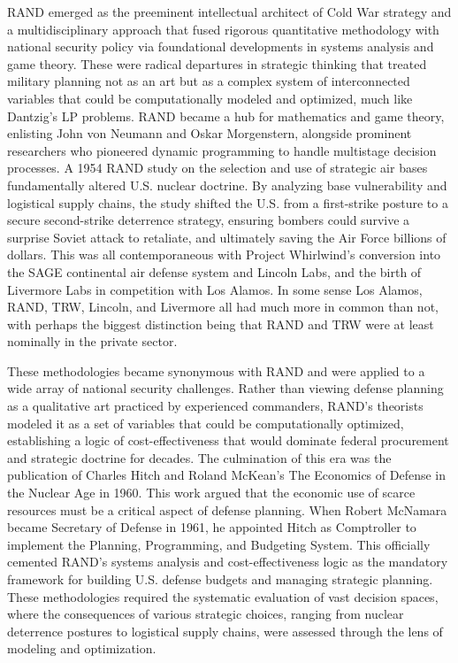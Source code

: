 RAND emerged as the preeminent intellectual architect of Cold War strategy and a multidisciplinary approach that fused rigorous quantitative methodology with national security policy via foundational developments in systems analysis and game theory. These were radical departures in strategic thinking that treated military planning not as an art but as a complex system of interconnected variables that could be computationally modeled and optimized, much like Dantzig’s LP problems. RAND became a hub for mathematics and game theory, enlisting John von Neumann and Oskar Morgenstern, alongside prominent researchers who pioneered dynamic programming to handle multistage decision processes. A 1954 RAND study on the selection and use of strategic air bases fundamentally altered U.S. nuclear doctrine. By analyzing base vulnerability and logistical supply chains, the study shifted the U.S. from a first-strike posture to a secure second-strike deterrence strategy, ensuring bombers could survive a surprise Soviet attack to retaliate, and ultimately saving the Air Force billions of dollars. This was all contemporaneous with Project Whirlwind’s conversion into the SAGE continental air defense system and Lincoln Labs, and the birth of Livermore Labs in competition with Los Alamos. In some sense Los Alamos, RAND, TRW, Lincoln, and Livermore all had much more in common than not, with perhaps the biggest distinction being that RAND and TRW were at least nominally in the private sector.

These methodologies became synonymous with RAND and were applied to a wide array of national security challenges. Rather than viewing defense planning as a qualitative art practiced by experienced commanders, RAND’s theorists modeled it as a set of variables that could be computationally optimized, establishing a logic of cost-effectiveness that would dominate federal procurement and strategic doctrine for decades. The culmination of this era was the publication of Charles Hitch and Roland McKean's The Economics of Defense in the Nuclear Age in 1960. This work argued that the economic use of scarce resources must be a critical aspect of defense planning. When Robert McNamara became Secretary of Defense in 1961, he appointed Hitch as Comptroller to implement the Planning, Programming, and Budgeting System. This officially cemented RAND's systems analysis and cost-effectiveness logic as the mandatory framework for building U.S. defense budgets and managing strategic planning. These methodologies required the systematic evaluation of vast decision spaces, where the consequences of various strategic choices, ranging from nuclear deterrence postures to logistical supply chains, were assessed through the lens of modeling and optimization. 

